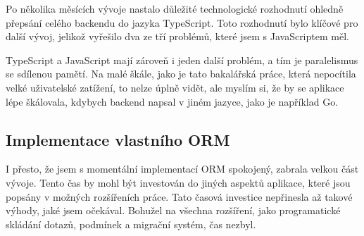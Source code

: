 Po několika měsících vývoje nastalo důležité technologické rozhodnutí ohledně přepsání celého backendu do jazyka TypeScript. Toto rozhodnutí bylo klíčové pro další vývoj, jelikož vyřešilo dva ze tří problémů, které jsem s JavaScriptem měl.

TypeScript a JavaScript mají zároveň i jeden další problém, a tím je paralelismus se sdílenou pamětí. Na malé škále, jako je tato bakalářská práce, která nepocítila velké uživatelské zatížení, to nelze úplně vidět, ale myslím si, že by se aplikace lépe škálovala, kdybych backend napsal v jiném jazyce, jako je například Go.

\subsection{Implementace vlastního ORM}

I přesto, že jsem s momentální implementací ORM spokojený, zabrala velkou část vývoje. Tento čas by mohl být investován do jiných aspektů aplikace, které jsou popsány v možných rozšířeních práce. Tato časová investice nepřinesla až takové výhody, jaké jsem očekával. Bohužel na všechna rozšíření, jako programatické skládání dotazů, podmínek a migrační systém, čas nezbyl.

